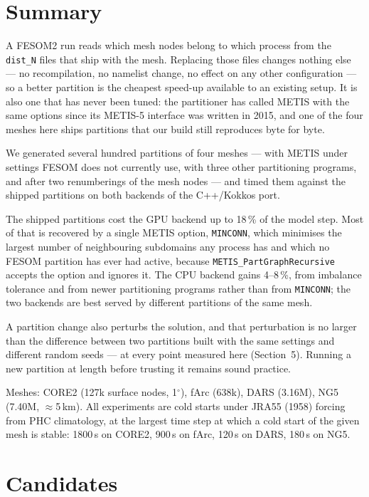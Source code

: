 \documentclass[11pt,a4paper]{article}
\newcommand{\minconn}{\texttt{MINCONN}}
\begin{document}
\section{Summary}

A FESOM2 run reads which mesh nodes belong to which process from the \texttt{dist\_N} files
that ship with the mesh. Replacing those files changes nothing else --- no recompilation, no
namelist change, no effect on any other configuration --- so a better partition is the
cheapest speed-up available to an existing setup. It is also one that has never been tuned:
the partitioner has called METIS with the same options since its METIS-5 interface was written
in 2015, and one of the four meshes here ships partitions that our build still reproduces byte
for byte.

We generated several hundred partitions of four meshes --- with METIS under settings FESOM
does not currently use, with three other partitioning programs, and after two renumberings of
the mesh nodes --- and timed them against the shipped partitions on both backends of the
C++/Kokkos port.

The shipped partitions cost the GPU backend up to 18\,\% of the model step. Most of that is
recovered by a single METIS option, \minconn, which minimises the largest number of
neighbouring subdomains any process has and which no FESOM partition has ever had active,
because \texttt{METIS\_PartGraphRecursive} accepts the option and ignores it. The CPU backend
gains 4--8\,\%, from imbalance tolerance and from newer partitioning programs rather than from
\minconn; the two backends are best served by different partitions of the same mesh.

A partition change also perturbs the solution, and that perturbation is no larger than the
difference between two partitions built with the same settings and different random seeds ---
at every point measured here (Section~5). Running a new partition at length before trusting it
remains sound practice.

Meshes: CORE2 (127k surface nodes, 1$^\circ$), fArc (638k), DARS (3.16M), NG5 (7.40M, $\approx$5\,km).
All experiments are cold starts under JRA55 (1958) forcing from PHC climatology, at the largest
time step at which a cold start of the given mesh is stable: 1800\,s on CORE2, 900\,s on fArc,
120\,s on DARS, 180\,s on NG5.

\section{Candidates}
\end{document}
